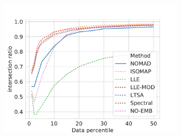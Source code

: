 \documentclass[twoside,11pt]{article}
\begin{document}
\begin{figure}
\begin{subfigure}{\textwidth}
\begin{footnotesize}
\begin{tabu}
		\includegraphics[width=\linewidth]{figures/geodesics/geodesics_circles_orthogonal_noise010_label0} \\


\end{tabu}
\end{footnotesize}
\end{subfigure}
\end{figure}
\end{document}
